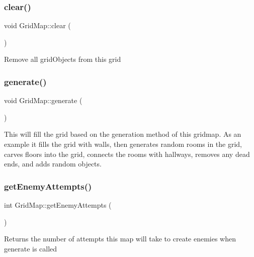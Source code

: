 \subsubsection{\texorpdfstring{clear()}{clear()}}
{\footnotesize\ttfamily void Grid\+Map\+::clear (\begin{DoxyParamCaption}{ }\end{DoxyParamCaption})}

Remove all grid\+Objects from this grid \mbox{\label{classGridMap_a24b8545a2b1b418568374c1088e1dffa}} 
\subsubsection{\texorpdfstring{generate()}{generate()}}
{\footnotesize\ttfamily void Grid\+Map\+::generate (\begin{DoxyParamCaption}{ }\end{DoxyParamCaption})}

This will fill the grid based on the generation method of this gridmap. As an example it fills the grid with walls, then generates random rooms in the grid, carves floors into the grid, connects the rooms with hallways, removes any dead ends, and adds random objects. \mbox{\label{classGridMap_a65a8b002122eb5e1ed97058f7bbb3ba0}} 
\subsubsection{\texorpdfstring{get\+Enemy\+Attempts()}{getEnemyAttempts()}}
{\footnotesize\ttfamily int Grid\+Map\+::get\+Enemy\+Attempts (\begin{DoxyParamCaption}{ }\end{DoxyParamCaption})}

\begin{DoxyReturn}{Returns}
the number of attempts this map will take to create enemies when generate is called 
\end{DoxyReturn}
\mbox{\label{classGridMap_a981cd7cdfe793fca98aa481acf4ba950}} 
